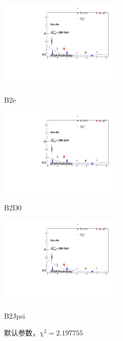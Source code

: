 \documentclass{ctexart}
\begin{document}
\begin{figure}[h]
\centering
\begin{minipage}[t]{0.48\textwidth}
\centering
\includegraphics[width=6cm]{src/run1/graph/B2e.pdf}
\caption{B2e}
\end{minipage}
\begin{minipage}[t]{0.48\textwidth}
\centering
\includegraphics[width=6cm]{src/run1/graph/B2D0.pdf}
\caption{B2D0}
\end{minipage}
\begin{minipage}[t]{0.48\textwidth}
\centering
\includegraphics[width=6cm]{src/run1/graph/B2Jpsi.pdf}
\caption{B2Jpsi}
\end{minipage}
\label{B1}
\caption{默认参数，$\chi^2=\num{2.197755}$}
\end{figure}
\end{document}
